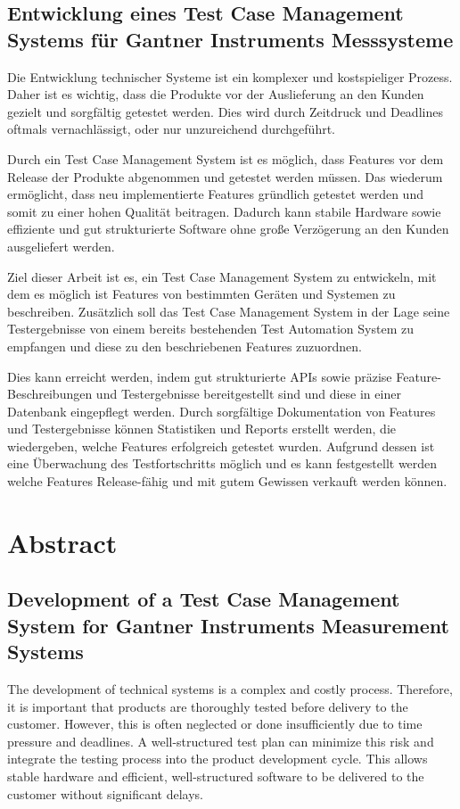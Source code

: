 \documentclass[a4paper, fontsize=11pt, parskip=half, twoside]{scrreprt}
\begin{document}
	\subsection*{Entwicklung eines Test Case Management Systems für Gantner Instruments Messsysteme}
	
	Die Entwicklung technischer Systeme ist ein komplexer und kostspieliger Prozess. 
	Daher ist es wichtig, dass die Produkte vor der Auslieferung an den Kunden gezielt und sorgfältig getestet werden. 
	Dies wird durch Zeitdruck und Deadlines oftmals vernachlässigt, oder nur unzureichend durchgeführt. 
	
	Durch ein Test Case Management System ist es möglich, dass Features vor dem Release der Produkte abgenommen und getestet werden müssen. 
	Das wiederum ermöglicht, dass neu implementierte Features gründlich getestet werden und somit zu einer hohen Qualität beitragen.
	Dadurch kann stabile Hardware sowie effiziente und gut strukturierte Software ohne große Verzögerung an den Kunden ausgeliefert werden.
	
	Ziel dieser Arbeit ist es, ein Test Case Management System zu entwickeln, mit dem es möglich ist Features von bestimmten Geräten und Systemen zu beschreiben.
	Zusätzlich soll das Test Case Management System in der Lage seine Testergebnisse von einem bereits bestehenden Test Automation System zu empfangen und diese zu den beschriebenen Features zuzuordnen.
	
	Dies kann erreicht werden, indem gut strukturierte APIs sowie präzise Feature-Beschreibungen und Testergebnisse bereitgestellt sind und diese in einer Datenbank eingepflegt werden. 
	Durch sorgfältige Dokumentation von Features und Testergebnisse können Statistiken und Reports erstellt werden, die wiedergeben, welche Features erfolgreich getestet wurden.
	Aufgrund dessen ist eine Überwachung des Testfortschritts möglich und es kann festgestellt werden welche Features Release-fähig und mit gutem Gewissen verkauft werden können.
	
	\newpage
	\section*{Abstract}
	\subsection*{Development of a Test Case Management System for Gantner Instruments Measurement Systems}
	
	The development of technical systems is a complex and costly process. 
	Therefore, it is important that products are thoroughly tested before delivery to the customer. 
	However, this is often neglected or done insufficiently due to time pressure and deadlines. 
	A well-structured test plan can minimize this risk and integrate the testing process into the product development cycle. 
	This allows stable hardware and efficient, well-structured software to be delivered to the customer without significant delays.
	
\end{document}

